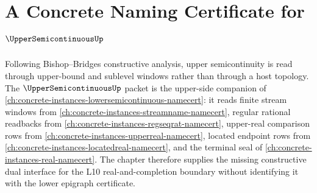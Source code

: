 \chapter{A Concrete Naming Certificate for $\UpperSemicontinuousUp$}
\label{ch:concrete-instances-uppersemicontinuous-namecert}

Following Bishop--Bridges constructive analysis, upper semicontinuity is read
through upper-bound and sublevel windows rather than through a host topology.
The $\UpperSemicontinuousUp$ packet is the upper-side companion of
\autoref{ch:concrete-instances-lowersemicontinuous-namecert}: it reads
finite stream windows from \autoref{ch:concrete-instances-streamname-namecert},
regular rational readbacks from \autoref{ch:concrete-instances-regseqrat-namecert},
upper-real comparison rows from \autoref{ch:concrete-instances-upperreal-namecert},
located endpoint rows from \autoref{ch:concrete-instances-locatedreal-namecert},
and the terminal seal of \autoref{ch:concrete-instances-real-namecert}. The
chapter therefore supplies the missing constructive dual interface for the
L10 real-and-completion boundary without identifying it with the lower
epigraph certificate.

